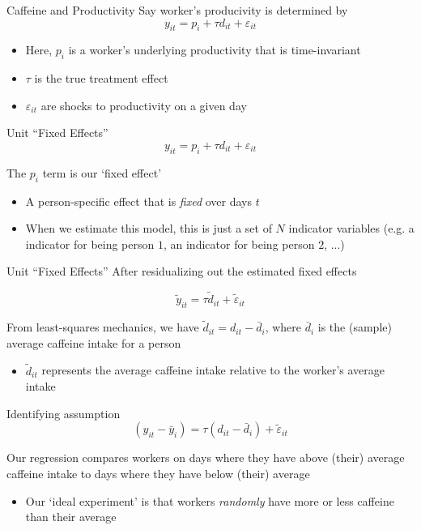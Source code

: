 \documentclass[aspectratio=169,t,11pt,table]{beamer}
\begin{document}
\begin{frame}{Caffeine and Productivity}
  Say worker's producivity is determined by 
  $$
    y_{it} = p_i + \tau d_{it} + \varepsilon_{it}
  $$
  \begin{itemize}
    \item Here, $p_i$ is a worker's underlying productivity that is time-invariant
    \item $\tau$ is the true treatment effect
    \item $\varepsilon_{it}$ are shocks to productivity on a given day
  \end{itemize}
\end{frame}

\begin{frame}{Unit ``Fixed Effects''}
  \vspace*{-\bigskipamount}
  $$
    y_{it} = p_i + \tau d_{it} + \varepsilon_{it}
  $$
  
  \bigskip
  The $p_i$ term is our `fixed effect'
  \begin{itemize}
    \item A person-specific effect that is \emph{fixed} over days $t$

    \item When we estimate this model, this is just a set of $N$ indicator variables (e.g. a indicator for being person $1$, an indicator for being person $2$, ...)
  \end{itemize}
\end{frame}

\begin{frame}{Unit ``Fixed Effects''}
  After residualizing out the estimated fixed effects

  $$
    \tilde{y}_{it} = \tau \tilde{d}_{it} + \tilde{\varepsilon}_{it}
  $$
  
  \bigskip
  From least-squares mechanics, we have $\tilde{d}_{it} = d_{it} - \bar{d}_i$, where $\bar{d}_i$ is the (sample) average caffeine intake for a person
  \begin{itemize}
    \item $\tilde{d}_{it}$ represents the average caffeine intake relative to the worker's average intake
  \end{itemize}
\end{frame}

\begin{frame}{Identifying assumption}
  \vspace*{-\bigskipamount}
  $$
    \left(y_{it} - \bar{y}_i\right) = \tau \left(d_{it} - \bar{d}_i\right) + \tilde{\varepsilon}_{it}
  $$
  
  \bigskip
  Our regression compares workers on days where they have above (their) average caffeine intake to days where they have below (their) average
  \begin{itemize}
    \item Our `ideal experiment' is that workers \emph{randomly} have more or less caffeine than their average
  \end{itemize}
\end{frame}
\end{document}
